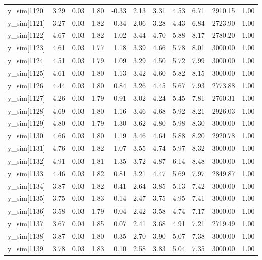 \begin{table}[ht]
\begin{tabular}{rrrrrrrrrrr}
  y\_sim[1120] & 3.29 & 0.03 & 1.80 & -0.33 & 2.13 & 3.31 & 4.53 & 6.71 & 2910.15 & 1.00 \\ 
  y\_sim[1121] & 3.27 & 0.03 & 1.82 & -0.34 & 2.06 & 3.28 & 4.43 & 6.84 & 2723.90 & 1.00 \\ 
  y\_sim[1122] & 4.67 & 0.03 & 1.82 & 1.02 & 3.44 & 4.70 & 5.88 & 8.17 & 2780.20 & 1.00 \\ 
  y\_sim[1123] & 4.61 & 0.03 & 1.77 & 1.18 & 3.39 & 4.66 & 5.78 & 8.01 & 3000.00 & 1.00 \\ 
  y\_sim[1124] & 4.51 & 0.03 & 1.79 & 1.09 & 3.29 & 4.50 & 5.72 & 7.99 & 3000.00 & 1.00 \\ 
  y\_sim[1125] & 4.61 & 0.03 & 1.80 & 1.13 & 3.42 & 4.60 & 5.82 & 8.15 & 3000.00 & 1.00 \\ 
  y\_sim[1126] & 4.44 & 0.03 & 1.80 & 0.84 & 3.26 & 4.45 & 5.67 & 7.93 & 2773.88 & 1.00 \\ 
  y\_sim[1127] & 4.26 & 0.03 & 1.79 & 0.91 & 3.02 & 4.24 & 5.45 & 7.81 & 2760.31 & 1.00 \\ 
  y\_sim[1128] & 4.69 & 0.03 & 1.80 & 1.16 & 3.46 & 4.68 & 5.92 & 8.21 & 2926.03 & 1.00 \\ 
  y\_sim[1129] & 4.80 & 0.03 & 1.79 & 1.30 & 3.62 & 4.80 & 5.98 & 8.30 & 3000.00 & 1.00 \\ 
  y\_sim[1130] & 4.66 & 0.03 & 1.80 & 1.19 & 3.46 & 4.64 & 5.88 & 8.20 & 2920.78 & 1.00 \\ 
  y\_sim[1131] & 4.76 & 0.03 & 1.82 & 1.07 & 3.55 & 4.74 & 5.97 & 8.32 & 3000.00 & 1.00 \\ 
  y\_sim[1132] & 4.91 & 0.03 & 1.81 & 1.35 & 3.72 & 4.87 & 6.14 & 8.48 & 3000.00 & 1.00 \\ 
  y\_sim[1133] & 4.46 & 0.03 & 1.82 & 0.81 & 3.21 & 4.47 & 5.69 & 7.97 & 2849.87 & 1.00 \\ 
  y\_sim[1134] & 3.87 & 0.03 & 1.82 & 0.41 & 2.64 & 3.85 & 5.13 & 7.42 & 3000.00 & 1.00 \\ 
  y\_sim[1135] & 3.75 & 0.03 & 1.83 & 0.14 & 2.47 & 3.75 & 4.95 & 7.41 & 3000.00 & 1.00 \\ 
  y\_sim[1136] & 3.58 & 0.03 & 1.79 & -0.04 & 2.42 & 3.58 & 4.74 & 7.17 & 3000.00 & 1.00 \\ 
  y\_sim[1137] & 3.67 & 0.04 & 1.85 & 0.07 & 2.41 & 3.68 & 4.91 & 7.21 & 2719.49 & 1.00 \\ 
  y\_sim[1138] & 3.87 & 0.03 & 1.80 & 0.35 & 2.70 & 3.90 & 5.07 & 7.38 & 3000.00 & 1.00 \\ 
  y\_sim[1139] & 3.78 & 0.03 & 1.83 & 0.10 & 2.58 & 3.83 & 5.04 & 7.35 & 3000.00 & 1.00 \\ 

\end{tabular}
\end{table}
